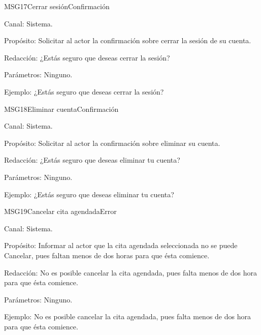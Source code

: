 \begin{mensaje}{MSG17}{Cerrar sesión}{Confirmación}
	\item[Canal:] Sistema.
    \item[Propósito:] Solicitar al actor la confirmación sobre cerrar la sesión de su cuenta.
    \item[Redacción:] ¿Estás seguro que deseas cerrar la sesión?
    \item[Parámetros:] Ninguno.
    \item[Ejemplo:] ¿Estás seguro que deseas cerrar la sesión?
\end{mensaje}

\begin{mensaje}{MSG18}{Eliminar cuenta}{Confirmación}
	\item[Canal:] Sistema.
    \item[Propósito:] Solicitar al actor la confirmación sobre eliminar su cuenta.
    \item[Redacción:] ¿Estás seguro que deseas eliminar tu cuenta?
    \item[Parámetros:] Ninguno.
    \item[Ejemplo:] ¿Estás seguro que deseas eliminar tu cuenta?
\end{mensaje}

\begin{mensaje}{MSG19}{Cancelar cita agendada}{Error}
	\item[Canal:] Sistema.
    \item[Propósito:] Informar al actor que la cita agendada seleccionada no se puede Cancelar, pues faltan menos de dos horas para que ésta comience. 
    \item[Redacción:] No es posible cancelar la cita agendada, pues falta menos de dos hora para que ésta comience.
    \item[Parámetros:] Ninguno.
    \item[Ejemplo:] No es posible cancelar la cita agendada, pues falta menos de dos hora para que ésta comience.
\end{mensaje}

